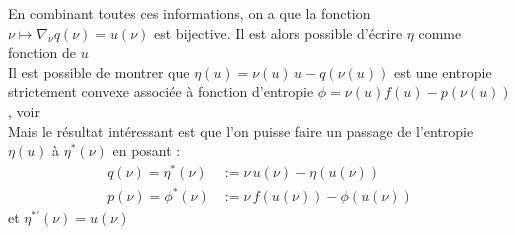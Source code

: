 En combinant toutes ces informations, on a que la fonction $\nu \mapsto \nabla_\nu q(\nu) = u(\nu)$ est bijective. Il est alors possible d'écrire $\eta$ comme fonction de $u$\\
Il est possible de montrer que $\eta(u) = \nu(u) \, u - q(\nu(u))$ est une entropie strictement convexe associée à fonction d'entropie $\phi = \nu(u) f(u) - p(\nu(u))$, voir \cite{godlewski2021numerical}\\

Mais le résultat intéressant est que l'on puisse faire un passage de l'entropie $\eta(u)$ à $\eta^*(\nu)$ en posant : 
\begin{align}
    q(\nu) = \eta^*(\nu) &:= \nu \, u(\nu)   - \eta(u(\nu))\\
    p(\nu) = \phi^*(\nu) &:=\nu \, f(u(\nu)) - \phi(u(\nu))
\end{align} 
et $\eta^{*'}(\nu) = u(\nu)$ 